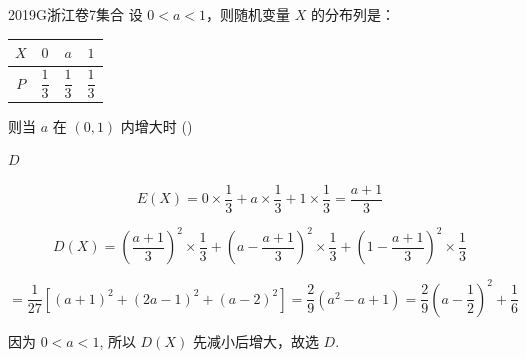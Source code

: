 
\begin{problem}{2019}{G}{浙江卷}{7}{集合}
设 $0<a<1$，则随机变量 $X$ 的分布列是：
\begin{tabular}{|c|ccc|}
\hline
$X$ & $0$ & $a$ & $1$ \\
\hline
$P$ & $\dfrac{1}{3}$ & $\dfrac{1}{3}$ & $\dfrac{1}{3}$\\
\hline
\end{tabular}

则当 $a$ 在 $(0,1)$ 内增大时 (\hspace{1cm})
\begin{choices}
\end{choices}
\end{problem}

\begin{answer}
$D$
\end{answer}

\begin{solutions}
$$
E(X)=0\times\frac{1}{3}+a\times\frac{1}{3}+1\times\frac{1}{3}=\frac{a+1}{3}
$$

$$
D(X)=\left(\frac{a+1}{3}\right)^{2}\times\frac{1}{3}+\left(a-\frac{a+1}{3}\right)^{2}\times\frac{1}{3}+\left(1-\frac{a+1}{3}\right)^{2}\times\frac{1}{3}
$$

$$
=\frac{1}{27}\left[(a+1)^{2}+(2a-1)^{2}+(a-2)^{2}\right]=\frac{2}{9}(a^{2}-a+1)=\frac{2}{9}\left(a-\frac{1}{2}\right)^{2}+\frac{1}{6}
$$

因为 $0<a<1$, 所以 $D(X)$ 先减小后增大，故选 $D$.
\end{solutions}